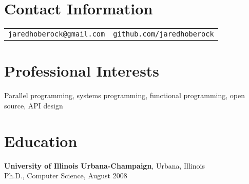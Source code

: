 \documentclass[margin,line]{res}
\newenvironment{list1}{
  \begin{list}{\ding{113}}{%
      \setlength{\itemsep}{0in}
      \setlength{\parsep}{0in} \setlength{\parskip}{0in}
      \setlength{\topsep}{0in} \setlength{\partopsep}{0in}
      \setlength{\leftmargin}{0.17in}}}{\end{list}}
\newenvironment{list2}{
  \begin{list}{$\bullet$}{%
      \setlength{\itemsep}{0in}
      \setlength{\parsep}{0in} \setlength{\parskip}{0in}
      \setlength{\topsep}{0in} \setlength{\partopsep}{0in}
      \setlength{\leftmargin}{0.2in}}}{\end{list}}
\begin{document}
\vspace*{-1.75cm}

\begin{resume}
\section{\sc Contact Information}
\vspace{.05in}


\begin{tabular}{@{}l|l}
\texttt{jaredhoberock@gmail.com} & \texttt{github.com/jaredhoberock} \\
\end{tabular}

\section{\sc Professional Interests}
Parallel programming, systems programming, functional programming, open source, API design

\section{\sc Education}
{\bf University of Illinois Urbana-Champaign}, Urbana, Illinois\\
Ph.D., Computer Science, August 2008


\end{resume}
\end{document}
